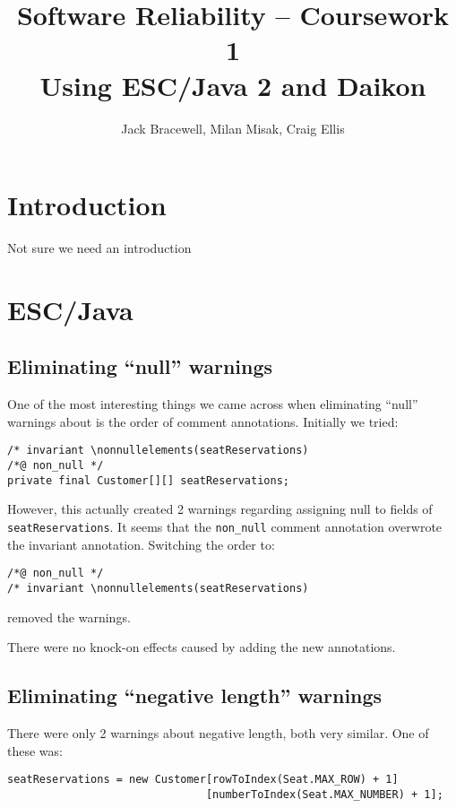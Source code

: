 \documentclass[11pt]{article}
\title{Software Reliability -- Coursework 1 \\ Using ESC/Java 2 and Daikon}
\author{Jack Bracewell, Milan Misak, Craig Ellis}
\date{}
\begin{document}
\maketitle

\section{Introduction}

Not sure we need an introduction

\section{ESC/Java}

\subsection{Eliminating ``null'' warnings}

One of the most interesting things we came across when eliminating ``null'' warnings about is the order of comment annotations. Initially we tried:

\noindent
\begin{verbatim}
/* invariant \nonnullelements(seatReservations)
/*@ non_null */
private final Customer[][] seatReservations;
\end{verbatim}

However, this actually created 2 warnings regarding assigning null to fields of \verb|seatReservations|. It seems that the \verb|non_null| comment annotation overwrote the invariant annotation. Switching the order to:

\noindent
\begin{verbatim}
/*@ non_null */
/* invariant \nonnullelements(seatReservations)
\end{verbatim}

removed the warnings.

There were no knock-on effects caused by adding the new annotations.

\subsection{Eliminating ``negative length'' warnings}

There were only 2 warnings about negative length, both very similar. One of these was:

\noindent
\begin{verbatim}
seatReservations = new Customer[rowToIndex(Seat.MAX_ROW) + 1]
                               [numberToIndex(Seat.MAX_NUMBER) + 1];
\end{verbatim}
\end{document}
